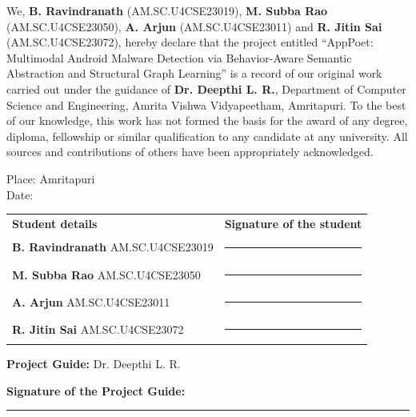 \documentclass[12pt,a4paper,oneside]{report}
\newcommand{\ProjectTitle}{AppPoet: Multimodal Android Malware Detection via Behavior-Aware Semantic Abstraction and Structural Graph Learning}
\begin{document}
\noindent
We, \textbf{B. Ravindranath} (AM.SC.U4CSE23019),
\textbf{M. Subba Rao} (AM.SC.U4CSE23050),
\textbf{A. Arjun} (AM.SC.U4CSE23011) and
\textbf{R. Jitin Sai} (AM.SC.U4CSE23072),
hereby declare that the project entitled
``\ProjectTitle{}'' is a record of our original work
carried out under the guidance of \textbf{Dr. Deepthi L. R.},
Department of Computer Science and Engineering,
Amrita Vishwa Vidyapeetham, Amritapuri.
To the best of our knowledge, this work has not formed the
basis for the award of any degree, diploma, fellowship or
similar qualification to any candidate at any university.
All sources and contributions of others have been
appropriately acknowledged.

\vspace{0.5cm}

\noindent
Place: Amritapuri\\
Date: 

\vspace{0.7cm}

\noindent
\begin{tabular}{@{}p{}p{}@{}}
\textbf{Student details} & \textbf{Signature of the student} \\[14pt]

\textbf{B. Ravindranath}\newline
AM.SC.U4CSE23019
& \rule{0.30\textwidth}{0.4pt} \\[18pt]

\textbf{M. Subba Rao}\newline
AM.SC.U4CSE23050
& \rule{0.30\textwidth}{0.4pt} \\[18pt]

\textbf{A. Arjun}\newline
AM.SC.U4CSE23011
& \rule{0.30\textwidth}{0.4pt} \\[18pt]

\textbf{R. Jitin Sai}\newline
AM.SC.U4CSE23072
& \rule{0.30\textwidth}{0.4pt}
\end{tabular}

\vspace{0.8cm}

\noindent
\textbf{Project Guide:} Dr. Deepthi L. R.

\vspace{0.5cm}

\noindent
\textbf{Signature of the Project Guide:}
\rule{4cm}{0.4pt}

\clearpage
{}
\pagestyle{plain}
\end{document}
